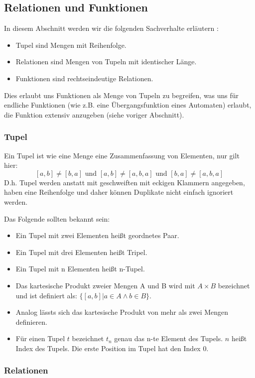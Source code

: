 \subsection{Relationen und Funktionen}\label{relationenUndFunktionen}
In diesem Abschnitt werden wir die folgenden Sachverhalte erläutern :
\begin{itemize}
    \item Tupel sind Mengen mit Reihenfolge.
    \item Relationen sind Mengen von Tupeln mit identischer Länge.
    \item Funktionen sind rechtseindeutige Relationen.
\end{itemize}
Dies erlaubt uns Funktionen als Menge von Tupeln zu begreifen,
was uns für endliche Funktionen
(wie z.B. eine Übergangsfunktion eines Automaten)
erlaubt,
die Funktion extensiv anzugeben (siehe voriger Abschnitt).

\subsubsection{Tupel}

Ein Tupel ist wie eine Menge eine Zusammenfassung von Elementen, nur gilt hier:
\[[a,b] \neq [b,a] \text{ und } [a,b] \neq [a,b,a] \text{ und } [b,a] \neq [a,b,a]\]
D.h. Tupel werden anstatt mit geschweiften mit eckigen Klammern angegeben,
haben eine Reihenfolge und daher können Duplikate nicht einfach ignoriert werden.

\noindent
Das Folgende sollten bekannt sein:
\begin{itemize}
    \item Ein Tupel mit zwei Elementen heißt geordnetes Paar.
    \item Ein Tupel mit drei Elementen heißt Tripel.
    \item Ein Tupel mit n    Elementen heißt n-Tupel.
    \item Das kartesische Produkt zweier Mengen A und B wird mit $A \times B$ bezeichnet
          und ist definiert als: $\{[a,b]|a \in A \wedge b \in B\}$.
    \item Analog lässts sich das kartesische Produkt von mehr als zwei Mengen definieren.
    \item Für einen Tupel $t$ bezeichnet $t_n$ genau das n-te Element des Tupels.
        $n$ heißt Index des Tupels. Die erste Position im Tupel hat den Index 0.
\end{itemize}

\subsubsection{Relationen}

